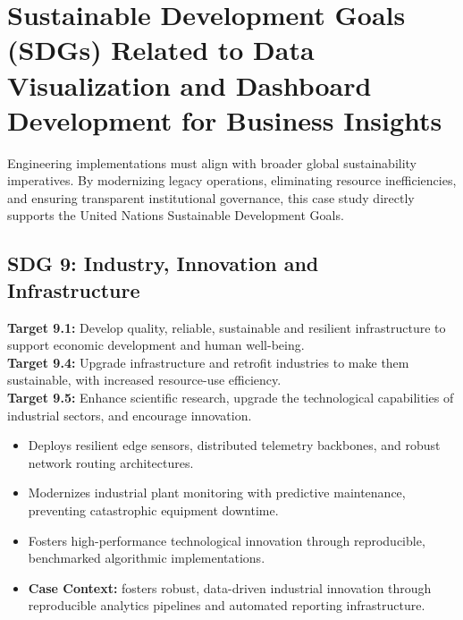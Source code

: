 \section{Sustainable Development Goals (SDGs) Related to Data Visualization and Dashboard Development for Business Insights}
Engineering implementations must align with broader global sustainability imperatives. By modernizing legacy operations, eliminating resource inefficiencies, and ensuring transparent institutional governance, this case study directly supports the United Nations Sustainable Development Goals.

\subsection{SDG 9: Industry, Innovation and Infrastructure}
\noindent\textbf{Target 9.1:} Develop quality, reliable, sustainable and resilient infrastructure to support economic development and human well-being. \\
\noindent\textbf{Target 9.4:} Upgrade infrastructure and retrofit industries to make them sustainable, with increased resource-use efficiency. \\
\noindent\textbf{Target 9.5:} Enhance scientific research, upgrade the technological capabilities of industrial sectors, and encourage innovation.
\begin{itemize}
  \item Deploys resilient edge sensors, distributed telemetry backbones, and robust network routing architectures.
  \item Modernizes industrial plant monitoring with predictive maintenance, preventing catastrophic equipment downtime.
  \item Fosters high-performance technological innovation through reproducible, benchmarked algorithmic implementations.
  \item \textbf{Case Context:} fosters robust, data-driven industrial innovation through reproducible analytics pipelines and automated reporting infrastructure.
\end{itemize}
